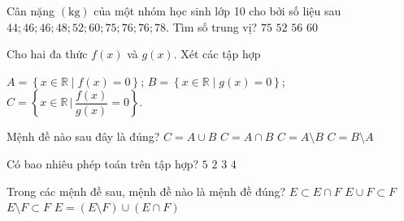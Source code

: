 \begin{ex}%
	Cân nặng $(\mathrm{kg})$ của một  nhóm học sinh lớp 10 cho bởi số liệu sau \linebreak
	 $44; 46; 46; 48; 52; 60; 75; 76; 76; 78$.
	Tìm số  trung vị?
	\choice 
		{$  75 $ }
		{$  52 $}
		{\True  $ 56 $ }
		{$ 60  $}
\end{ex}

\begin{ex}%
	Cho hai đa thức $f(x)$ và  $g(x)$. Xét các tập hợp
	\begin{center}
		$A=\left\{x\in  \mathbb{R} \mid f(x)=0 \right\}$; $B=\left\{x\in \mathbb{R} \mid g(x)=0 \right\}$; $C=\left\{x\in \mathbb{R} \, \Bigg | \, \dfrac{f(x)}{g(x)} =0 \right\}.$
	\end{center}
	Mệnh  đề nào sau đây là đúng?
	\choice 
		{$C=A\cup B$} 
		{$C=A\cap B$} 
		{\True  $C=A\setminus B$}
		{$C=B\setminus  A$}
\end{ex}

\begin{ex}%
	Có bao nhiêu phép toán trên tập hợp? 
	\choice 
		 { $5$}
		{$2$} 
		 {\True $3$}
		{$4$} 
\end{ex}

\begin{ex}%
	Trong các mệnh đề sau, mệnh đề nào là mệnh  đề đúng?
	 \choice
		 {$E\subset E\cap F$}
		{$E\cup  F\subset F$}
		{$E\setminus F\subset  F$}
		{\True  $ E=(E\setminus F)\cup (E\cap F)$}
\end{ex}

